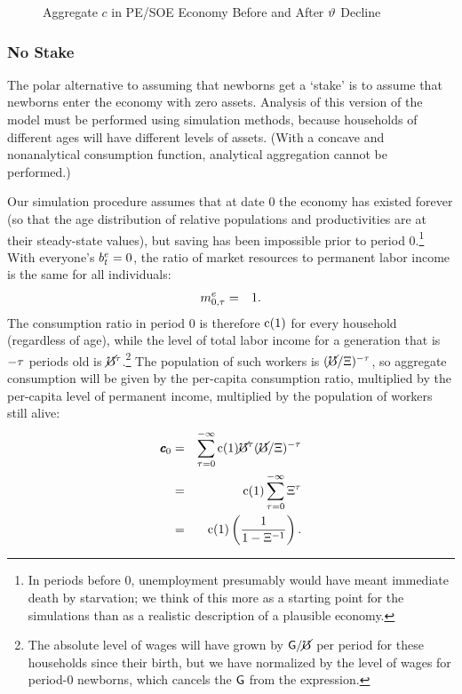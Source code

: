 \message{ !name(TractableBufferStock.tex)}\documentclass{handout}
\begin{document}
\begin{figure}
\caption{Aggregate $c$ in PE/SOE Economy Before and After $\vartheta$ Decline}
\label{fig:SOEStakescPathAfterThetaDropPlot}
\end{figure}

\subsubsection{No Stake}

The polar alternative to assuming that newborns get a `stake' is to
assume that newborns enter the economy with zero assets.  Analysis of
this version of the model must be performed using simulation methods,
because households of different ages will have different levels of
assets.  (With a concave and nonanalytical consumption function,
analytical aggregation cannot be performed.)

Our simulation procedure assumes that at date 0 the economy has existed forever (so 
that the age distribution of relative populations and productivities are at their steady-state values), but saving has been impossible prior to
period 0.\footnote{In periods before 0, unemployment presumably would have 
meant immediate death by starvation; we think of this more as a starting point
for the simulations than as a realistic description of a plausible economy.}
With everyone's $b^{e}_{t}=0$, the ratio of market resources to permanent
labor income is the same for all individuals:
\begin{eqnarray}
  m^{e}_{0,\tau} & = & 1
.
\end{eqnarray}
The consumption ratio in period 0 is therefore $\mathrm{c}(1)$ for every
household (regardless of age), while the
level of total labor income for a generation that is $-\tau$ periods old is $\cancel{\mho}^{\tau}$.\footnote{The absolute level of wages will have
grown by $\mathsf{G}/\cancel{\mho}$ per period for these households since their birth, but we have normalized by the level of wages
for period-0 newborns, which cancels the $\mathsf{G}$ from the expression.}  The population of
such workers is $(\cancel{\mho}/\Xi)^{-\tau}$, so aggregate consumption will
be given by the per-capita consumption ratio, multiplied by the
per-capita level of permanent income, multiplied by the population of
workers still alive:
\begin{eqnarray}
  \pmb{c}_{0} & = & \sum_{\tau=0}^{-\infty} \mathrm{c}(1) \cancel{\mho}^{\tau} (\cancel{\mho}/\Xi)^{-\tau}
\\ & = & \mathrm{c}(1) \sum_{\tau=0}^{-\infty}  \Xi^{\tau}
\\ & = & \mathrm{c}(1) \left(\frac{1}{1-\Xi^{-1}}\right)
.
\end{eqnarray}
\end{document}

